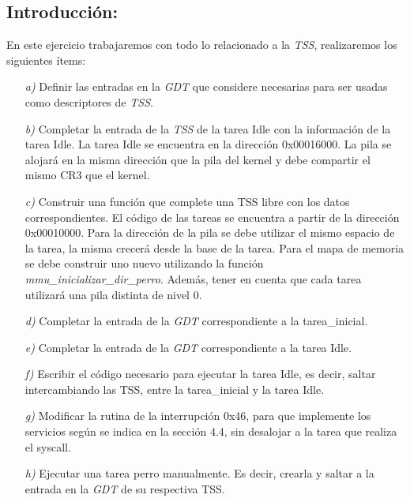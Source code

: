 \subsection{Introducción:}

En este ejercicio trabajaremos con todo lo relacionado a la \textit{TSS}, realizaremos los siguientes ítems:

\begin{itemize}



\item [\textit{a)}]  Definir las entradas en la \textit{GDT} que considere necesarias para ser usadas como descriptores de \textit{TSS}.

\item [\textit{b)}] Completar la entrada de la \textit{TSS} de la tarea Idle con la información de la tarea Idle. La tarea Idle se encuentra en la dirección 0x00016000. La pila se alojará en la misma dirección que la pila del kernel y debe compartir el mismo CR3 que el kernel.

\item [\textit{c)}]  Construir una función que complete una TSS libre con los datos correspondientes. El código de las tareas se encuentra a partir de la dirección 0x00010000. Para la dirección de la pila se debe utilizar el mismo espacio de la tarea, la misma crecerá desde la base de la tarea. Para el mapa de memoria se debe construir uno nuevo utilizando la función \textit{mmu\_inicializar\_dir\_perro}. Además, tener en cuenta que cada tarea utilizará una pila distinta de nivel 0. 

\item [\textit{d)}] Completar la entrada de la \textit{GDT} correspondiente a la tarea\_inicial.

\item [\textit{e)}]  Completar la entrada de la \textit{GDT} correspondiente a la tarea Idle.

\item [\textit{f)}]  Escribir el código necesario para ejecutar la tarea Idle, es decir, saltar intercambiando las TSS, entre la tarea\_inicial y la tarea Idle.

\item [\textit{g)}] Modificar la rutina de la interrupción 0x46, para que implemente los servicios según se indica en la sección 4.4, sin desalojar a la tarea que realiza el syscall.

\item [\textit{h)}]  Ejecutar una tarea perro manualmente. Es decir, crearla y saltar a la entrada en la \textit{GDT} de su respectiva TSS.

\end{itemize}

